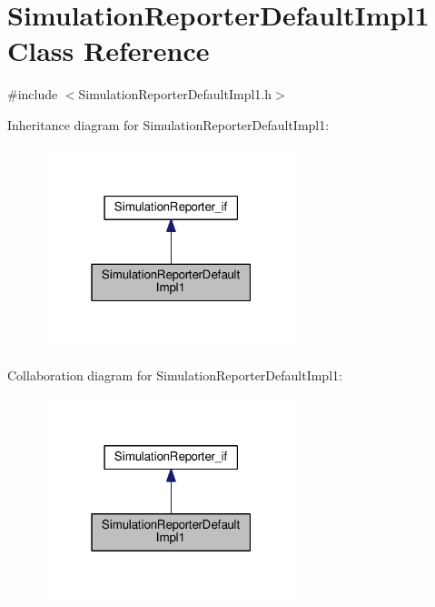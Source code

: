\hypertarget{class_simulation_reporter_default_impl1}{}\section{Simulation\+Reporter\+Default\+Impl1 Class Reference}
\label{class_simulation_reporter_default_impl1}


{\ttfamily \#include $<$Simulation\+Reporter\+Default\+Impl1.\+h$>$}



Inheritance diagram for Simulation\+Reporter\+Default\+Impl1\+:\nopagebreak
\begin{figure}[H]
\begin{center}
\leavevmode
\includegraphics[width=211pt]{class_simulation_reporter_default_impl1__inherit__graph}
\end{center}
\end{figure}


Collaboration diagram for Simulation\+Reporter\+Default\+Impl1\+:\nopagebreak
\begin{figure}[H]
\begin{center}
\leavevmode
\includegraphics[width=211pt]{class_simulation_reporter_default_impl1__coll__graph}
\end{center}
\end{figure}
